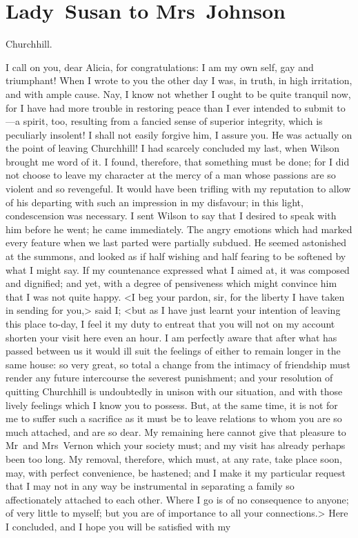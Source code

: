 \chapter{Lady~Susan to Mrs~Johnson}
  
  	\begin{a4}
	\vspace{5em}
	\end{a4}
	
  \begin{mail}{Churchhill.}{}

I call on you, dear Alicia, for congratulations: I am my own self, gay and triumphant! When I wrote to you the other day I was, in truth, in high irritation, and with ample cause. Nay, I know not whether I ought to be quite tranquil now, for I have had more trouble in restoring peace than I ever intended to submit to—a spirit, too, resulting from a fancied sense of superior integrity, which is peculiarly insolent! I shall not easily forgive him, I assure you. He was actually on the point of leaving Churchhill! I had scarcely concluded my last, when Wilson brought me word of it. I found, therefore, that something must be done; for I did not choose to leave my character at the mercy of a man whose passions are so violent and so revengeful. It would have been trifling with my reputation to allow of his departing with such an impression in my disfavour; in this light, condescension was necessary. I sent Wilson to say that I desired to speak with him before he went; he came immediately. The angry emotions which had marked every feature when we last parted were partially subdued. He seemed astonished at the summons, and looked as if half wishing and half fearing to be softened by what I might say. If my countenance expressed what I aimed at, it was composed and dignified; and yet, with a degree of pensiveness which might convince him that I was not quite happy. <I beg your pardon, sir, for the liberty I have taken in sending for you,> said I; <but as I have just learnt your intention of leaving this place to-day, I feel it my duty to entreat that you will not on my account shorten your visit here even an hour. I am perfectly aware that after what has passed between us it would ill suit the feelings of either to remain longer in the same house: so very great, so total a change from the intimacy of friendship must render any future intercourse the severest punishment; and your resolution of quitting Churchhill is undoubtedly in unison with our situation, and with those lively feelings which I know you to possess. But, at the same time, it is not for me to suffer such a sacrifice as it must be to leave relations to whom you are so much attached, and are so dear. My remaining here cannot give that pleasure to Mr~and Mrs~Vernon which your society must; and my visit has already perhaps been too long. My removal, therefore, which must, at any rate, take place soon, may, with perfect convenience, be hastened; and I make it my particular request that I may not in any way be instrumental in separating a family so affectionately attached to each other. Where I go is of no consequence to anyone; of very little to myself; but you are of importance to all your connections.> Here I concluded, and I hope you will be satisfied with my 
\end{mail}

